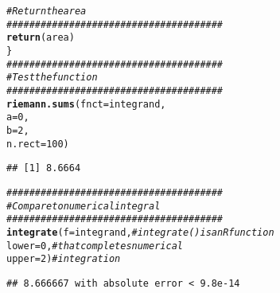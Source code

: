 \documentclass{article}\usepackage[]{graphicx}\usepackage[]{xcolor}
\makeatletter
\newcommand{\hlnum}[1]{\textcolor[rgb]{0.686,0.059,0.569}{#1}}%
\newcommand{\hlcom}[1]{\textcolor[rgb]{0.678,0.584,0.686}{\textit{#1}}}%
\newcommand{\hldef}[1]{\textcolor[rgb]{0.345,0.345,0.345}{#1}}%
\newcommand{\hlkwc}[1]{\textcolor[rgb]{0.333,0.667,0.333}{#1}}%
\newcommand{\hlkwd}[1]{\textcolor[rgb]{0.737,0.353,0.396}{\textbf{#1}}}%
\newenvironment{kframe}{%
 \def\at@end@of@kframe{}%
 \ifinner\ifhmode%
  \def\at@end@of@kframe{\end{minipage}}%
  \begin{minipage}{\columnwidth}%
 \fi\fi%
 \def\FrameCommand##1{\hskip\@totalleftmargin \hskip-\fboxsep
 \colorbox{shadecolor}{##1}\hskip-\fboxsep
     \hskip-\linewidth \hskip-\@totalleftmargin \hskip\columnwidth}%
 \MakeFramed {\advance\hsize-\width
   \@totalleftmargin\z@ \linewidth\hsize
   \@setminipage}}%
 {\par\unskip\endMakeFramed%
 \at@end@of@kframe}
\newenvironment{knitrout}{}{} %
\makeatother
\begin{document}
\begin{enumerate}
\begin{enumerate}
\begin{knitrout}
\begin{kframe}
\begin{alltt}
  \hlcom{# Return the area}
  \hlcom{######################################}
  \hlkwd{return}\hldef{(area)}
\hldef{\}}
\hlcom{######################################}
\hlcom{# Test the function}
\hlcom{######################################}
\hlkwd{riemann.sums}\hldef{(}\hlkwc{fnct} \hldef{= integrand,}
             \hlkwc{a} \hldef{=} \hlnum{0}\hldef{,}
             \hlkwc{b} \hldef{=} \hlnum{2}\hldef{,}
             \hlkwc{n.rect} \hldef{=} \hlnum{100}\hldef{)}
\end{alltt}
\begin{verbatim}
## [1] 8.6664
\end{verbatim}
\begin{alltt}
\hlcom{######################################}
\hlcom{# Compare to numerical integral}
\hlcom{######################################}
\hlkwd{integrate}\hldef{(}\hlkwc{f} \hldef{= integrand,} \hlcom{# integrate() is an R function}
          \hlkwc{lower} \hldef{=} \hlnum{0}\hldef{,}     \hlcom{# that completes numerical}
          \hlkwc{upper} \hldef{=} \hlnum{2}\hldef{)}     \hlcom{# integration}
\end{alltt}
\begin{verbatim}
## 8.666667 with absolute error < 9.8e-14
\end{verbatim}
\end{kframe}
\end{knitrout}
\end{enumerate}
\end{enumerate}


\end{document}
